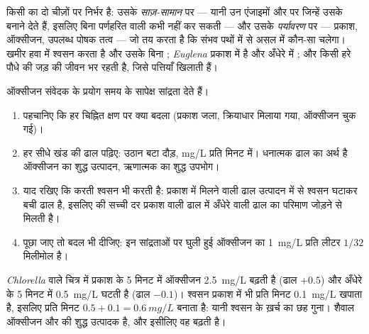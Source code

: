 \begin{proposition}[जीन और पर्यावरण]\label{prop:g10:cell-metabolism:decides}
किसी  का  दो चीज़ों पर निर्भर है: उसके
\emph{साज़-सामान} पर --- यानी उन एंजाइमों और  पर जिन्हें उसके
 बनाने देते हैं, इसलिए बिना पर्णहरित वाली  कभी 
नहीं कर सकती --- और उसके \emph{पर्यावरण} पर --- प्रकाश, ऑक्सीजन, उपलब्ध
पोषक तत्व --- जो तय करता है कि संभव पथों में से असल में कौन-सा चलेगा।
खमीर हवा में श्वसन करता है और उसके बिना ; \emph{Euglena} प्रकाश में
 है और अँधेरे में ; और किसी हरे पौधे की जड़ की  जीवन
भर  रहती है, जिसे पत्तियाँ खिलाती हैं।
\end{proposition}
\admitted

\begin{method}[उपापचय का आलेख पढ़ना]\label{met:g10:cell-metabolism:trace}
ऑक्सीजन संवेदक के प्रयोग समय के सापेक्ष सांद्रता देते हैं।
\begin{enumerate}
  \item पहचानिए कि हर चिह्नित क्षण पर क्या बदला (प्रकाश जला, क्रियाधार
        मिलाया गया, ऑक्सीजन चुक गई)।
  \item हर सीधे खंड की ढाल पढ़िए: उठान बटा दौड़, \unit{mg/L} प्रति मिनट
        में। धनात्मक ढाल का अर्थ है ऑक्सीजन का शुद्ध उत्पादन, ऋणात्मक का
        शुद्ध उपभोग।
  \item याद रखिए कि  करती  श्वसन भी करती है: प्रकाश
        में मिलने वाली ढाल उत्पादन में से श्वसन घटाकर बची ढाल है, इसलिए
         की सच्ची दर प्रकाश वाली ढाल में अँधेरे वाली ढाल
        का परिमाण जोड़ने से मिलती है।
  \item पूछा जाए तो बदल भी दीजिए: इन सांद्रताओं पर घुली हुई ऑक्सीजन का
        \qty{1}{mg/L} प्रति लीटर $1/32$ मिलीमोल है।
\end{enumerate}
\end{method}

\begin{example}[शैवाल की सच्ची दर]\label{ex:g10:cell-metabolism:truerate}
\emph{Chlorella} वाले चित्र में प्रकाश के 5 मिनट में ऑक्सीजन
\qty{2.5}{mg/L} बढ़ती है (ढाल $+0.5$) और अँधेरे के 5 मिनट में
\qty{0.5}{mg/L} घटती है (ढाल $-0.1$)। श्वसन प्रकाश में भी प्रति मिनट
\qty{0.1}{mg/L} खपाता है, इसलिए  प्रति मिनट
$0.5 + 0.1 = \qty{0.6}{mg/L}$ बनाता है: यानी श्वसन के ख़र्च का छह गुना।
शैवाल ऑक्सीजन और  की शुद्ध उत्पादक है, और इसीलिए वह
बढ़ती है।
\end{example}

